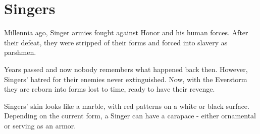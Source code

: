 \section{Singers}
\label{enemySinger}

Millennia ago, Singer armies fought against Honor and his human forces. After their defeat, they were stripped of their forms and forced into slavery as parshmen.

Years passed and now nobody remembers what happened back then. However, Singers' hatred for their enemies never extinguished. Now, with the Everstorm they are reborn into forms lost to time, ready to have their revenge.

Singers' skin looks like a marble, with red patterns on a white or black surface. Depending on the current form, a Singer can have a carapace - either ornamental or serving as an armor.



\newpage








